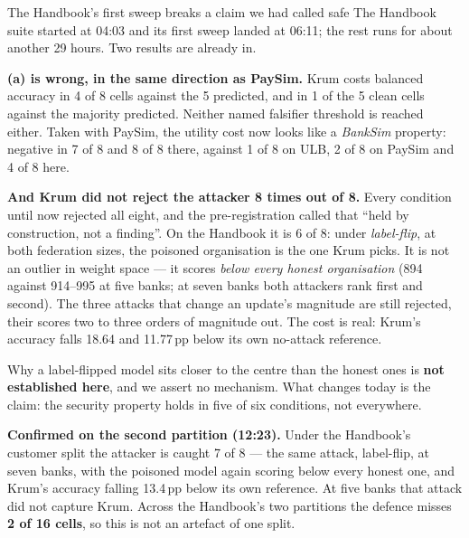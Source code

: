 \documentclass[11pt]{article}
\begin{document}
\begin{warnbox}{The Handbook's first sweep breaks a claim we had called safe}
The Handbook suite started at 04:03 and its first sweep landed at 06:11; the rest runs for about another
29 hours. Two results are already in.

\textbf{(a) is wrong, in the same direction as PaySim.} Krum costs balanced accuracy in 4 of 8 cells
against the 5 predicted, and in 1 of the 5 clean cells against the majority predicted. Neither named
falsifier threshold is reached either. Taken with PaySim, the utility cost now looks like a \emph{BankSim}
property: negative in 7 of 8 and 8 of 8 there, against 1 of 8 on ULB, 2 of 8 on PaySim and 4 of 8 here.

\textbf{And Krum did not reject the attacker 8 times out of 8.} Every condition until now rejected all
eight, and the pre-registration called that ``held by construction, not a finding''. On the Handbook it is
6 of 8: under \emph{label-flip}, at both federation sizes, the poisoned organisation is the one Krum
picks. It is not an outlier in weight space --- it scores \emph{below every honest organisation} (894
against 914--995 at five banks; at seven banks both attackers rank first and second). The three attacks
that change an update's magnitude are still rejected, their scores two to three orders of magnitude out.
The cost is real: Krum's accuracy falls 18.64 and 11.77\,pp below its own no-attack reference.

Why a label-flipped model sits closer to the centre than the honest ones is \textbf{not established
here}, and we assert no mechanism. What changes today is the claim: the security property holds in five
of six conditions, not everywhere.

\textbf{Confirmed on the second partition (12:23).} Under the Handbook's customer split the attacker is
caught 7 of 8 --- the same attack, label-flip, at seven banks, with the poisoned model again scoring below
every honest one, and Krum's accuracy falling 13.4\,pp below its own reference. At five banks that attack
did not capture Krum. Across the Handbook's two partitions the defence misses \textbf{2 of 16 cells}, so
this is not an artefact of one split.
\end{warnbox}
\end{document}
